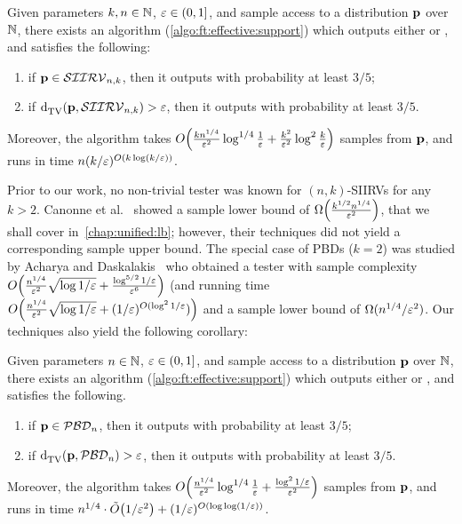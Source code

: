 \begin{theorem}\label{theo:testing:ksiirv}
    Given parameters $k,n\in\N$, $\eps\in(0,1]$, and sample access to a distribution $\p$ over $\N$, there exists an algorithm (\cref{algo:ft:effective:support}) which outputs either \accept or \reject, and satisfies the following:
    \begin{enumerate}
        \item if $\p \in \classksiirv[n]{k}$, then it outputs \accept with probability at least $3/5$;
        \item if $\totalvardist{\p}{\classksiirv[n]{k}}>\eps$, then it outputs \reject with probability at least $3/5$.
    \end{enumerate}
    Moreover, the algorithm takes $\bigO{\frac{k n^{1/4}}{\eps^2}\log^{1/4}\frac{1}{\eps} + \frac{k^2}{\eps^2} \log^2\frac{k}{\eps}}$ samples from $\p$, and runs in time $n(k/\eps)^{\bigO{k\log(k/\eps)}}$.
\end{theorem}

Prior to our work, no non-trivial tester was known for $(n, k)$-SIIRVs for any $k>2$. 
Canonne et al.~\cite{CDGR:16} showed a sample lower bound of $\bigOmega{\frac{k^{1/2}n^{1/4}}{\eps^2}}$, that we shall cover in~\cref{chap:unified:lb}; however, their techniques
did not yield a corresponding sample upper bound. The special case of PBDs ($k=2$) was studied by 
Acharya and Daskalakis~\cite{AD:15} who obtained a tester with sample complexity 
$\bigO{\frac{n^{1/4}}{\eps^2}\sqrt{\log1/\eps}+\frac{\log^{5/2}1/\eps}{\eps^6}}$ (and running time $\bigO{\frac{n^{1/4}}{\eps^2}\sqrt{\log1/\eps}+(1/\eps)^{O(\log^2 1/\eps})}$ and a sample lower bound of $\Omega(n^{1/4}/\eps^2)$. 
Our techniques also yield the following corollary: 
\begin{theorem}\label{theo:testing:[bd}
    Given parameters $n\in\N$, $\eps\in(0,1]$, and sample access to a distribution $\p$ over $\N$, there exists an algorithm (\cref{algo:ft:effective:support}) which outputs either \accept or \reject, and satisfies the following.
    \begin{enumerate}
        \item if $\p \in \classpbd[n]$, then it outputs \accept with probability at least $3/5$;
        \item if $\totalvardist{\p}{\classpbd[n]} > \eps$, then it outputs \reject with probability at least $3/5$.
    \end{enumerate}
    Moreover, the algorithm takes $\bigO{\frac{n^{1/4}}{\eps^2}\log^{1/4}\frac{1}{\eps} + \frac{\log^2 1/\eps}{\eps^2}}$ samples from $\p$, and runs in time $n^{1/4}\cdot\tildeO{{1}/{\eps^2}}+(1/\eps)^{\bigO{\log\log(1/\eps)}}$.
\end{theorem}


